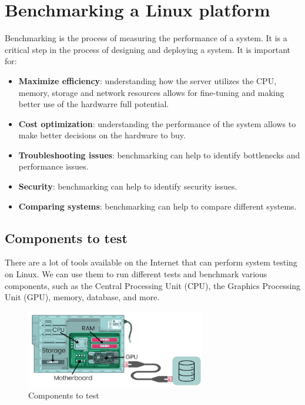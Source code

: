 
\chapter{Benchmarking a Linux platform}

Benchmarking is the process of measuring the performance of a system. It is a critical step in the process of designing and deploying a system. 
It is important for:
\begin{itemize}
    \item \textbf{Maximize efficiency}: understanding how the server utilizes the CPU, memory, storage and network resources allows for fine-tuning and making better use of the hardwarre full potential.
    \item \textbf{Cost optimization}: understanding the performance of the system allows to make better decisions on the hardware to buy.
    \item \textbf{Troubleshooting issues}: benchmarking can help to identify bottlenecks and performance issues.
    \item \textbf{Security}: benchmarking can help to identify security issues.
    \item \textbf{Comparing systems}: benchmarking can help to compare different systems.
\end{itemize}

\section{Components to test}

There are a lot of tools available on the Internet that can perform
system testing on Linux. We can use them to run different tests and
benchmark various components, such as the Central Processing
Unit (CPU), the Graphics Processing Unit (GPU), memory, database,
and more.

\begin{figure}[H]
    \centering
    \includegraphics[width=0.7\textwidth]{assets/fig33.png}
    \caption{Components to test}
\end{figure}

